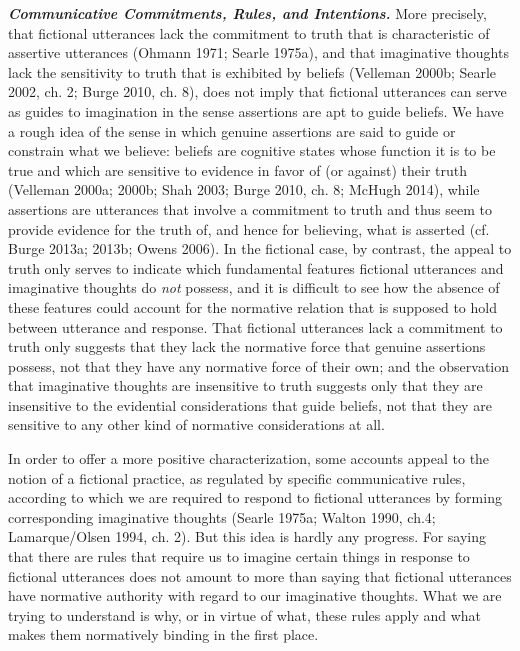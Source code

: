 \vspace{.2cm}
\noindent \textbf{\emph{Communicative Commitments, Rules, and Intentions.}} More precisely, that fictional utterances lack the commitment to truth that is characteristic of assertive utterances (Ohmann 1971; Searle 1975a), and that imaginative thoughts lack the sensitivity to truth that is exhibited by beliefs (Velleman 2000b; Searle 2002, ch. 2; Burge 2010, ch. 8), does not imply that fictional utterances can serve as guides to imagination in the sense assertions are apt to guide beliefs. We have a rough idea of the sense in which genuine assertions are said to guide or constrain what we believe: beliefs are cognitive states whose function it is to be true and which are sensitive to evidence in favor of (or against) their truth (Velleman 2000a; 2000b; Shah 2003; Burge 2010, ch. 8; McHugh 2014), while assertions are utterances that involve a commitment to truth and thus seem to provide evidence for the truth of, and hence for believing, what is asserted (cf. Burge 2013a; 2013b; Owens 2006). In the fictional case, by contrast, the appeal to truth only serves to indicate which fundamental features fictional utterances and imaginative thoughts do \emph{not} possess, and it is difficult to see how the absence of these features could account for the normative relation that is supposed to hold between utterance and response. That fictional utterances lack a commitment to truth only suggests that they lack the normative force that genuine assertions possess, not that they have any normative force of their own; and the observation that imaginative thoughts are insensitive to truth suggests only that they are insensitive to the evidential considerations that guide beliefs, not that they are sensitive to any other kind of normative considerations at all.

In order to offer a more positive characterization, some accounts appeal to the notion of a fictional practice, as regulated by specific communicative rules, according to which we are required to respond to fictional utterances by forming corresponding imaginative thoughts (Searle 1975a; Walton 1990, ch.4; Lamarque/Olsen 1994, ch. 2). But this idea is hardly any progress. For saying that there are rules that require us to imagine certain things in response to fictional utterances does not amount to more than saying that fictional utterances have normative authority with regard to our imaginative thoughts. What we are trying to understand is why, or in virtue of what, these rules apply and what makes them normatively binding in the first place.

